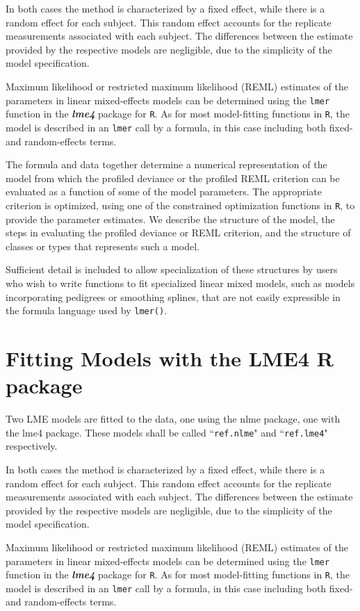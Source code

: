 \documentclass[12pt, a4paper]{report}
\theoremstyle{plain}
\theoremstyle{definition}
\theoremstyle{remark}
\begin{document}
In both cases the method is characterized by a fixed effect, while there is a random effect for each subject. This random effect accounts for the replicate measurements associated with each subject. The differences between the estimate provided by the respective models are negligible, due to the simplicity of the model specification.

Maximum likelihood or restricted maximum likelihood (REML) estimates of the parameters in linear mixed-effects models can be determined using the \texttt{lmer} function in the \textbf{\textit{lme4}} package for \texttt{R}. As for most model-fitting functions in \texttt{R}, the model is described in an \texttt{lmer} call by a formula, in this case including both fixed- and random-effects terms. 

The formula and data together determine a numerical representation of the model from which the profiled deviance or the profiled REML criterion can be evaluated as a function of some of the model parameters. The appropriate criterion is optimized, using one of the constrained optimization functions in \texttt{R}, to provide the parameter estimates. We describe the structure of the model, the steps in evaluating the profiled deviance or REML criterion, and the structure of classes or types that represents such a model. 

Sufficient detail is included to allow specialization of these structures by users who wish to write functions to fit specialized linear mixed models, such as models incorporating pedigrees or smoothing splines, that are not easily expressible in the formula language used by \texttt{lmer()}.


\newpage

\section{Fitting Models with the LME4 R package}
Two LME models are fitted to the data, one using the nlme package, one with the lme4 package. These models shall be called ``\texttt{ref.nlme}" and ``\texttt{ref.lme4}" respectively.

In both cases the method is characterized by a fixed effect, while there is a random effect for each subject. This random effect accounts for the replicate measurements associated with each subject. The differences between the estimate provided by the respective models are negligible, due to the simplicity of the model specification.

Maximum likelihood or restricted maximum likelihood (REML) estimates of the parameters in linear mixed-effects models can be determined using the \texttt{lmer} function in the \textbf{\textit{lme4}} package for \texttt{R}. As for most model-fitting functions in \texttt{R}, the model is described in an \texttt{lmer} call by a formula, in this case including both fixed- and random-effects terms. 
\end{document}
